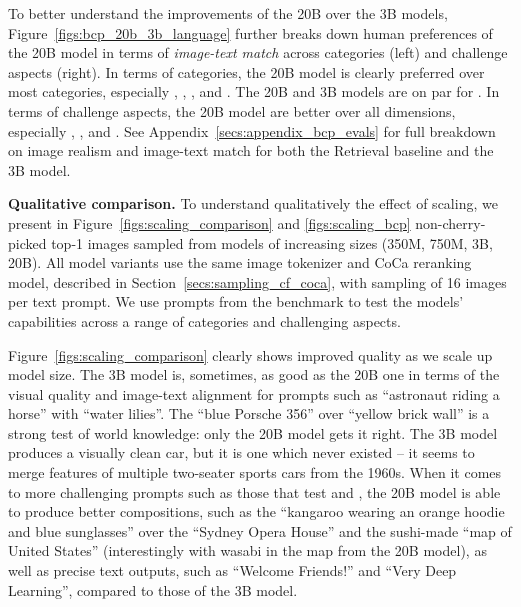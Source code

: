 To better understand the improvements of the 20B over the 3B models, Figure~\ref{figs:bcp_20b_3b_language} further breaks down human preferences of the 20B model in terms of \textit{image-text match} across \bcpa{} categories (left) and challenge aspects (right). In terms of categories, the 20B model is clearly preferred over most categories, especially , , , and . The 20B and 3B models are on par for .
In terms of challenge aspects, the 20B model are better over all dimensions, especially , , and . See Appendix~\ref{secs:appendix_bcp_evals} for full breakdown on image realism and image-text match for both the Retrieval baseline and the 3B model.



\textbf{Qualitative comparison.}
To understand qualitatively the effect of scaling, we present in Figure~\ref{figs:scaling_comparison} and \ref{figs:scaling_bcp} non-cherry-picked top-1 images sampled from \bdraw models of increasing sizes (350M, 750M, 3B, 20B). All model variants use the same image tokenizer and CoCa reranking model, described in Section~\ref{secs:sampling_cf_coca}, with sampling of 16 images per text prompt. We use prompts from the \bcpa{} benchmark to test the models' capabilities across a range of categories and challenging aspects.

Figure~\ref{figs:scaling_comparison} clearly shows improved quality as we scale up model size. The 3B model is, sometimes, as good as the 20B one in terms of the visual quality and image-text alignment for  prompts such as ``astronaut riding a horse'' with ``water lilies''. The ``blue Porsche 356'' over ``yellow brick wall'' is a strong test of world knowledge: only the 20B model gets it right. The 3B model produces a visually clean car, but it is one which never existed -- it seems to merge features of multiple two-seater sports cars from the 1960s. When it comes to more challenging prompts such as those that test  and , the 20B model is able to produce better compositions, such as the ``kangaroo wearing an orange hoodie and blue sunglasses'' over the ``Sydney Opera House'' and the sushi-made ``map of United States'' (interestingly with wasabi in the map from the 20B model), as well as precise text outputs, such as ``Welcome Friends!'' and ``Very Deep Learning'', compared to those of the 3B model.

